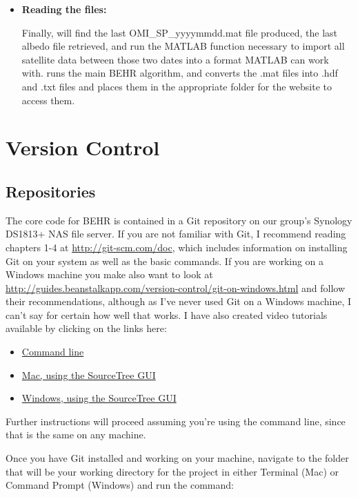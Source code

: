 \documentclass[12pt]{article}
\begin{document}
\begin{itemize}
			\item \textbf{Reading the files:}
			
			Finally,  will find the last OMI\_SP\_yyyymmdd.mat file produced, the last albedo file retrieved, and run the MATLAB function necessary to import all satellite data between those two dates into a format MATLAB can work with.  runs the main BEHR algorithm, and  converts the .mat files into .hdf and .txt files and places them in the appropriate folder for the website to access them.
			
		\end{itemize}
		
		
		
\section{Version Control}\label{sec:version-control}
	\subsection{Repositories}
	The core code for BEHR is contained in a Git repository on our group's Synology DS1813+ NAS file server.  If you are not familiar with Git, I recommend reading chapters 1-4 at \url{http://git-scm.com/doc}, which includes information on installing Git on your system as well as the basic commands.  If you are working on a Windows machine you make also want to look at \url{http://guides.beanstalkapp.com/version-control/git-on-windows.html} and follow their recommendations, although as I've never used Git on a Windows machine, I can't say for certain how well that works. I have also created video tutorials available by clicking on the links here:
	\begin{itemize}
	\item \href{https://www.youtube.com/playlist?list=PL4hBjskP5N4fQDkb2DIHRX2Mn5nF6TDnf}{Command line}
	\item \href{https://www.youtube.com/playlist?list=PL4hBjskP5N4ekDz503xbV7tqDyZqRQMvc}{Mac, using the SourceTree GUI}
	\item \href{https://www.youtube.com/playlist?list=PL4hBjskP5N4dCs2H-QRUpONX8QohlEYei}{Windows, using the SourceTree GUI}
	\end{itemize}	 
	Further instructions will proceed assuming you're using the command line, since that is the same on any machine.	
	
	Once you have Git installed and working on your machine, navigate to the folder that will be your working directory for the project in either Terminal (Mac) or Command Prompt (Windows) and run the command:
\end{document}
